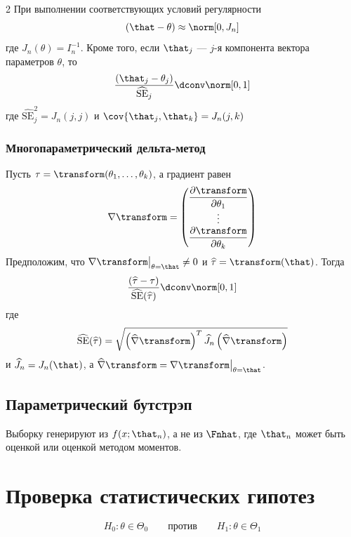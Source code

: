 \documentclass[landscape]{article}
\def\sehat{\ensuremath{\widehat{\mathrm{SE}}}}
\begin{document}
\begin{multicols*}{2}
При выполнении соответствующих условий регулярности
\[(\that-\theta) \approx \norm[0,J_n]\]
где $J_n(\theta) = I_n^{-1}$.
Кроме того, если $\that_j$ — $j$-я компонента вектора параметров $\theta$, то
\[\frac{(\that_j-\theta_j)}{\sehat_j} \dconv \norm[0,1]\] где $\sehat_j^2 =
J_n(j,j)$ и $\cov{\that_j,\that_k} = J_n(j,k)$

\subsubsection{Многопараметрический дельта-метод}

Пусть $\tau = \transform(\theta_1,\dots,\theta_k)$,
а градиент \transform равен
\[\nabla\transform = \begin{pmatrix}
  \displaystyle\frac{\partial\transform}{\partial\theta_1} \\
  \vdots \\
  \displaystyle\frac{\partial\transform}{\partial\theta_k} \\
\end{pmatrix}\]
Предположим, что $\bigl.\nabla\transform\bigr|_{\theta=\that} \neq 0$ и
$\widehat{\tau} = \transform(\that)$. Тогда
\[\frac{(\widehat{\tau}-\tau)}{\sehat(\widehat{\tau})} \dconv \norm[0,1]\]
где
\[\sehat(\widehat{\tau}) = \sqrt{\left( \widehat{\nabla}\transform \right)^T
\widehat{J}_n\left( \widehat{\nabla}\transform \right)}\]
и $\widehat{J}_n = J_n(\that)$, а $\widehat{\nabla}\transform =
\bigl.\nabla\transform\bigr|_{\theta=\that}$.

\subsection{Параметрический бутстрэп}

Выборку генерируют из $f(x;\that_n)$, а не из $\Fnhat$, где $\that_n$ может быть
оценкой \mle или оценкой методом моментов.

\section{Проверка статистических гипотез}

\[H_0:\theta\in\Theta_0 \qquad\text{против}\qquad H_1:\theta\in\Theta_1\]


\end{multicols*}
\end{document}
